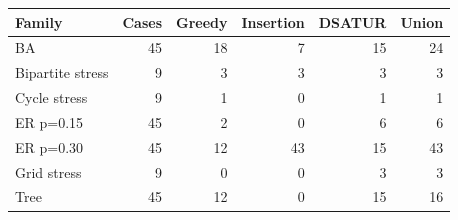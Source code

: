 \begin{tabular}{lrrrrr}
\toprule
Family & Cases & Greedy & Insertion & DSATUR & Union\\\midrule
BA & 45 & 18 & 7 & 15 & 24\\
Bipartite stress & 9 & 3 & 3 & 3 & 3\\
Cycle stress & 9 & 1 & 0 & 1 & 1\\
ER p=0.15 & 45 & 2 & 0 & 6 & 6\\
ER p=0.30 & 45 & 12 & 43 & 15 & 43\\
Grid stress & 9 & 0 & 0 & 3 & 3\\
Tree & 45 & 12 & 0 & 15 & 16\\
\bottomrule
\end{tabular}
